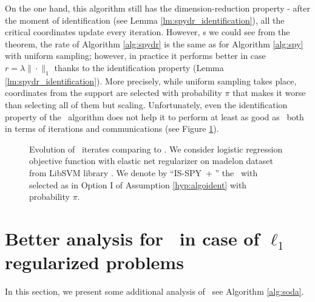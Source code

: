 On the one hand, this algorithm still has the dimension-reduction property - after the moment of identification (see Lemma \ref{lm:spydr_identification}), all the critical coordinates update every iteration. However, 
s we could see from the theorem, the rate of Algorithm \ref{alg:spydr} is the same as for Algorithm \ref{alg:spy} with uniform sampling; however, in practice it performs better in case $r = \lambda\|\cdot\|_1$ thanks to the identification property (Lemma \ref{lm:spydr_identification}). More precisely, while uniform sampling takes place, coordinates from the support are selected with probability $\pi$ that makes it worse than selecting all of them but scaling. Unfortunately, even the identification property of the \spyIS~algorithm does not help it to perform at least as good as \dave~both in terms of iterations and communications (see Figure \ref{fig:spydr}). 

\begin{figure}[H]
\begin{center}
 \hfill
{}
\end{center}
\caption{Evolution of \spyIS~iterates comparing to \dave. We consider logistic regression objective function with elastic net regularizer on madelon dataset from LibSVM library \cite{chang2011libsvm}. We denote by ``IS-SPY~+ \dg{$\pi$}'' the \spyIS~with selected as in Option I of Assumption \ref{hyp:algoident} with probability $\pi$.}
\label{fig:spydr}
\end{figure}

\section{Better analysis for \spyI~in case of $\ell_1$ regularized problems}\label{sec:i-spy}
In this section, we present some additional analysis of \spyI~see Algorithm \ref{alg:soda}.